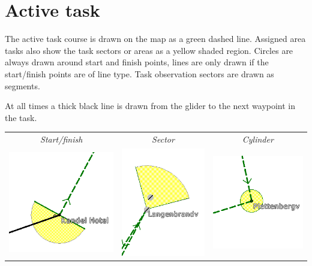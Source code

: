 \documentclass[a4paper,12pt]{refrep}
\begin{document}
\section{Active task}

The active task course is drawn on the map as a green dashed line.
Assigned area tasks also show the task sectors or areas as a yellow shaded
region.  
Circles are always drawn around start and finish points, lines are
only drawn if the start/finish points are of line type.  Task
observation sectors are drawn as segments.

At all times a thick black line is drawn from the glider to the next
waypoint in the task.

\begin{center}

\begin{tabular}{c c c}
{\it Start/finish} & {\it Sector} & {\it Cylinder} \\
\includegraphics[angle=0,width=0.3\linewidth,keepaspectratio='true']{figures/cut-startfinish.png} &
\includegraphics[angle=0,width=0.3\linewidth,keepaspectratio='true']{figures/cut-sector.png} &
\includegraphics[angle=0,width=0.3\linewidth,keepaspectratio='true']{figures/cut-barrel.png} \\
\end{tabular}
\end{center}
\end{document}
